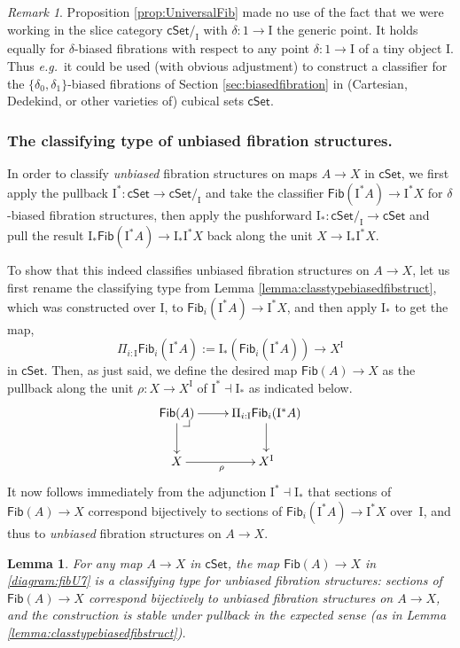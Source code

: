 \documentclass[11pt,reqno]{amsart}
\makeatletter
\newcommand{\eg}{\emph{e.g.}}
\newcommand{\cSet}{\ensuremath{\mathsf{cSet}}}
\newcommand{\ra}{\ensuremath{\rightarrow}}
\renewcommand{\to}{\ensuremath{\rightarrow}}
\newcommand{\too}{\ensuremath{\longrightarrow}}
\newcommand{\I}{\ensuremath{\mathrm{I}}}
\newcommand{\Fib}{\ensuremath{\mathsf{Fib}}}
\newtheorem{lemma}[theorem]{Lemma}
\theoremstyle{remark}
\newtheorem{remark}[theorem]{Remark}
\theoremstyle{definition}
\newcommand{\pbcorner}[1][dr]{\save*!/#1-1.2pc/#1:(-1,1)@^{|-}\restore}
\makeatother
\begin{document}
\begin{remark}
Proposition \ref{prop:UniversalFib} made no use of the fact that we were working in the slice category $\cSet/_\I$ with $\delta : 1\to\I$ the generic point. It holds equally for $\delta$-biased fibrations with respect to any point $\delta: 1\to\I$ of a tiny object $\I$.  Thus \eg\ it could be used (with obvious adjustment) to construct a classifier for the $\{\delta_0, \delta_1\}$-biased fibrations of Section \ref{sec:biasedfibration} in (Cartesian, Dedekind, or other varieties of) cubical sets $\cSet$.  
\end{remark}


\subsubsection*{The classifying type of unbiased fibration structures.}\label{par:classifyunbiasedfib} 

In order to classify \emph{unbiased} fibration structures on maps $A\to X$ in $\cSet$, we first apply the pullback $\I^*: \cSet \ra \cSet/_\I$ and take the classifier $\Fib(\I^*A)\ra \I^*X$ for $\delta$-biased fibration structures, then apply the pushforward $\I_*: \cSet/_\I \ra \cSet$ and pull the result   $\I_*\Fib(\I^*A)\ra \I_*\I^*X$ back along the unit  $X \to \I_*\I^*X$.  

To show that this indeed classifies unbiased fibration structures on $A\to X$, let us first rename the classifying type from Lemma \ref{lemma:classtypebiasedfibstruct}, which was constructed over $\I$, to $\Fib_i(\I^*A) \ra \I^{*}X$, and then apply $\I_*$ to get the map,
\[
\Pi_{i:\I}\Fib_i(\I^*A) := \I_*(\Fib_i(\I^*A)) \too X^\I
\]
in $\cSet$.  Then, as just said, we define the desired map $\Fib(A)\ra X$ as the pullback along the unit $\rho : X \ra X^\I$ of  $\I^*\dashv \I_*$ as indicated below.
\begin{equation}\label{diagram:fibU7}
\xymatrix{
 \Fib(A) \ar[d] \ar[r] \pbcorner & \ar[d] \Pi_{i:\I}\Fib_i(\I^*A) \\
 X \ar[r]_{\rho} &  X^\I
}
\end{equation}
It now follows immediately from the adjunction $\I^*\dashv \I_*$ that sections of $\Fib(A)\ra X$ correspond bijectively to sections of $\Fib_i (\I^*A)\ra \I^{*}X$ over~$\I$, and thus to \emph{unbiased} fibration structures on $A\to X$.

\begin{lemma}\label{lemma:classtypeunbiasedfibstruct}
For any map $A\ra X$ in $\cSet$, the map $\Fib(A)\ra X$ in \eqref{diagram:fibU7} is a \emph{classifying type for unbiased fibration structures}: sections of $\Fib(A)\ra X$ correspond bijectively to unbiased fibration structures on $A\ra X$, and the construction is stable under pullback in the expected sense (as in Lemma \ref{lemma:classtypebiasedfibstruct}).
\end{lemma}
\end{document}
